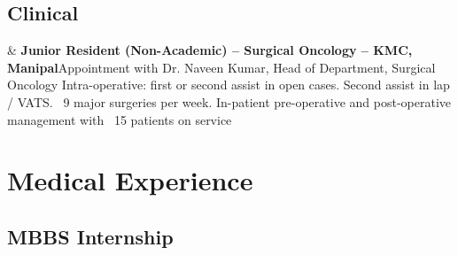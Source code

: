 \documentclass[10pt, letterpaper]{article}
\newcommand{\TablePad}{\vspace{-0.4cm}}
\newcommand{\Year}[1]{\fontsize{9pt}{0}\selectfont #1}
\newcommand{\Twoline}[2]{\textbf{#1}\newline  #2}
\begin{document}
\TablePad

\subsection{Clinical}
\TablePad
\begin{EntriesTable}
  \Year{2021} &
  \Twoline{Junior Resident (Non-Academic) – Surgical Oncology – KMC, Manipal}
  {Appointment with Dr. Naveen Kumar, Head of Department, Surgical Oncology\newline
  Intra-operative: first or second assist in open cases. Second assist in lap / VATS. ~9 major surgeries per week.\newline
  In-patient pre-operative and post-operative management with ~15 patients on service\newline
  }
\end{EntriesTable}


\section{Medical Experience}
\subsection{MBBS Internship}
\end{document}
